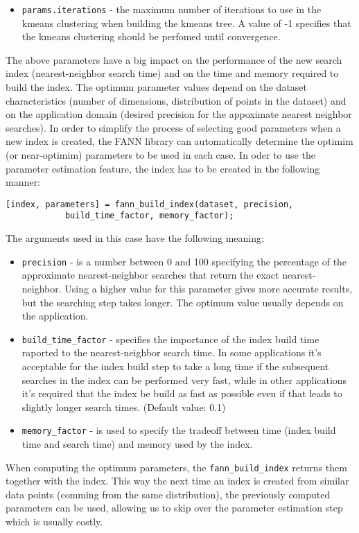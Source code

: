 \documentclass[letter,10pt]{article}
\begin{document}
\begin{description}
\begin{itemize}
	\item \texttt{params.iterations} - the maximum number of iterations to use in the kmeans clustering when building the kmeans tree. A value of -1 specifies that the kmeans clustering should be perfomed until convergence.
\end{itemize}

The above parameters have a big impact on the performance of the new search index (nearest-neighbor search time) and on the time and memory required to build the index. The optimum parameter values depend on the dataset characteristics (number of dimensions, distribution of points in the dataset) and on the application domain (desired precision for the appoximate nearest neighbor searches). In order to simplify the process of selecting good parameters when a new index is created, the FANN library can automatically determine the optimim (or near-optimim) parameters to 
be used in each case. In oder to use the parameter estimation feature, the index has to be created in the following manner:
\begin{Verbatim}
[index, parameters] = fann_build_index(dataset, precision, 
			build_time_factor, memory_factor);
\end{Verbatim}
The arguments used in this case have the following meaning:
\begin{itemize}
 \item \texttt{precision} - is a number between 0 and 100 specifying the percentage of the approximate nearest-neighbor searches that return the exact nearest-neighbor. Using a higher value for this parameter gives more accurate results, but the searching step takes longer. The optimum value usually depends on the application.

\item \texttt{build\_time\_factor} - specifies the importance of the index build time raported to the nearest-neighbor search time. In some applications it's acceptable for the index build step to take a long time if the subsequent searches in the index can be performed very fast, while in other applications it's required that the index be build as fast as possible even if that leads to slightly longer search times. (Default value: 0.1)

\item \texttt{memory\_factor} - is used to specify the tradeoff between time (index build time and search time) and memory used by the index.
\end{itemize}

When computing the optimum parameters, the \texttt{fann\_build\_index} returns them together with the index. This way the next time an index is created from similar data points (comming from the same distribution), the previously computed parameters can be used, allowing us to skip over the parameter estimation step which is usually costly.



\end{description}
\end{document}
